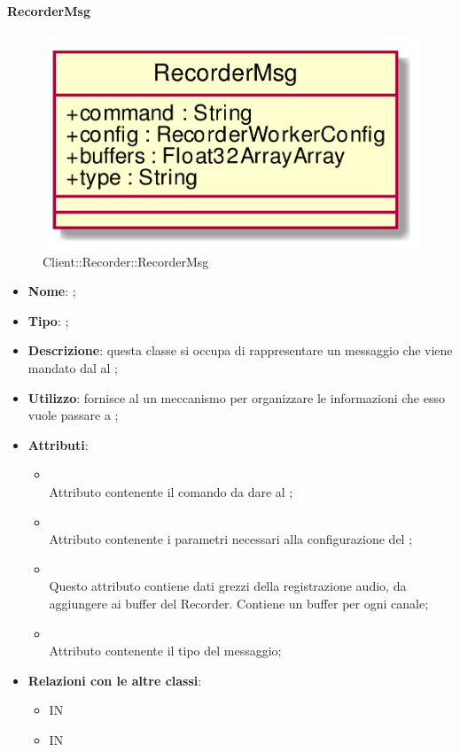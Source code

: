 \hypertarget{RecorderMsg_label}{\paragraph{RecorderMsg}}
\begin{figure}[h]
	\centering
	\includegraphics[width=\textwidth,height=\textheight,keepaspectratio]{images/ClassRecorderMsg.png}
	\caption{Client::Recorder::RecorderMsg}
\end{figure}
\begin{itemize}
	\item \textbf{Nome}: ;
	\item \textbf{Tipo}: ;
	\item \textbf{Descrizione}: questa classe si occupa di rappresentare un messaggio che viene mandato dal  al ;
	\item \textbf{Utilizzo}: fornisce al  un meccanismo per organizzare le informazioni che esso vuole passare a ;
	\item \textbf{Attributi}:
	\begin{itemize}
		\item[]  \\
		Attributo contenente il comando da dare al ;
		\item[]  \\
		Attributo contenente i parametri necessari alla configurazione del ;
		\item[]  \\
		Questo attributo contiene dati grezzi della registrazione audio, da aggiungere ai buffer del Recorder. Contiene un buffer per ogni canale;
		\item[]  \\
		Attributo contenente il tipo del messaggio;
	\end{itemize}
	\item \textbf{Relazioni con le altre classi}:
	\begin{itemize}
		\item IN \hyperlink{RecorderWorker_label}{}
		\item IN \hyperlink{Recorder_label}{}
	\end{itemize}
\end{itemize}
\FloatBarrier

